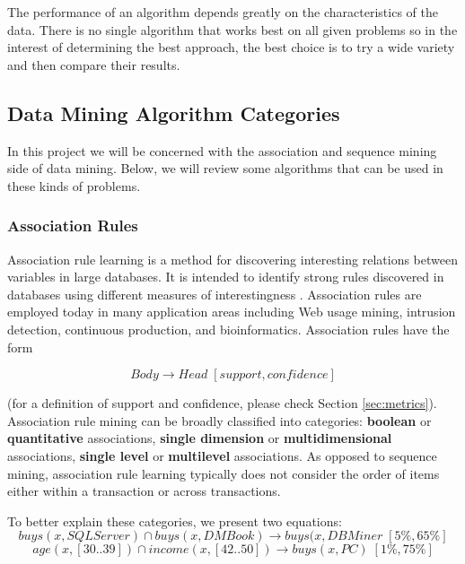 The performance of an algorithm depends greatly on the characteristics of the data. There is no single algorithm that works best on all given problems \cite{wolpert1995no} so in the interest of determining the best approach, the best choice is to try a wide variety and then compare their results.

\subsection{Data Mining Algorithm Categories}\label{sec:dmalgorithms}
In this project we will be concerned with the association and sequence mining side of data mining. Below, we will review some algorithms that can be used in these kinds of problems.

\subsubsection{Association Rules}
Association rule learning is a method for discovering interesting relations between variables in large databases. It is intended to identify strong rules discovered in databases using different measures of interestingness \cite{han2006data}. Association rules are employed today in many application areas including Web usage mining, intrusion detection, continuous production, and bioinformatics. Association rules have the form 

\begin{equation}Body \rightarrow Head\;[support, confidence]\end{equation} 

(for a definition of support and confidence, please check Section \ref{sec:metrics}). Association rule mining can be broadly classified into categories: \textbf{boolean} or \textbf{quantitative} associations, \textbf{single dimension} or \textbf{multidimensional} associations, \textbf{single level} or \textbf{multilevel} associations. As opposed to sequence mining, association rule learning typically does not consider the order of items either within a transaction or across transactions. 

To better explain these categories, we present two equations: 
\begin{equation}\label{eq:eq1} buys(x, SQLServer) \cap buys(x, DMBook) \rightarrow buys(x, DBMiner\;[5\%, 65\%]\end{equation} 
\begin{equation}\label{eq:eq2} age(x, [30..39]) \cap income(x, [42..50]) \rightarrow buys(x, PC)\;[1\%, 75\%]\end{equation}

